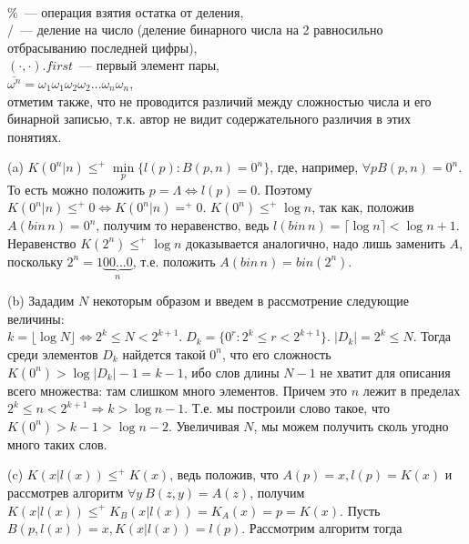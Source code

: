 
\\
\%~--- операция взятия остатка от деления, \\
/~--- деление на число (деление бинарного числа на 2 равносильно отбрасыванию последней цифры), \\
$(\cdot,\cdot).first$~--- первый элемент пары,\\
$\overline{\omega^n} = \omega_1\omega_1\omega_2\omega_2\ldots \omega_n\omega_n$, \\
отметим также, что не проводится различий между сложностью числа и его бинарной записью, т.к. автор не видит содержательного различия в этих понятиях. 

(a) $K(0^n|n)\le^+\min\limits_p\{l(p) \colon B(p,n)=0^n\}$, где, например, $ \forall p B(p,n)=0^n$. То есть можно положить $p=\Lambda \Leftrightarrow l(p)=0$. Поэтому   $K(0^n|n)\le^+0 \Leftrightarrow K(0^n|n)=^+0$.
$K(0^n)\le^+\log n$, так как, положив $A(bin\,n)=0^n$, получим то неравенство, ведь $l(bin \, n) = \lceil\log n\rceil <\log n +1$. 
Неравенство $K(2^n)\le^+\log n$ доказывается аналогично, надо лишь заменить $A$, поскольку $2^n=1\underbrace{00\ldots0}_n$, т.е. положить $A(bin\,n)=bin(2^n)$.

(b) Зададим $N$ некоторым образом и введем в рассмотрение следующие величины: $k=\lfloor\log N\rfloor \Leftrightarrow 2^k\le N < 2^{k+1}.\;
		D_k=\{0^r\colon 2^k\le r < 2^{k+1}\}.\; |D_k|=2^k\le N.$ Тогда среди элементов $D_k$ найдется такой $0^n$, что его сложность $K(0^n)> \log |D_k|-1=k-1$, ибо слов длины $N-1$ не хватит для описания всего множества: там слишком много элементов. Причем это $n$ лежит в пределах $2^k\le n < 2^{k+1} \Rightarrow k  > \log n -1$. Т.е. мы построили слово такое, что $K(0^n)>k-1>\log n -2$. Увеличивая $N$, мы можем получить сколь угодно много таких слов. 
		
(c) $K(x|l(x))\le^+K(x)$, ведь положив, что $A(p)=x, l(p)=K(x)$ и рассмотрев алгоритм $\forall y \: B(z,y)=A(z)$, получим $K(x|l(x))\le^+K_B(x|l(x))=K_A(x)=p=K(x)$.
Пусть $B(p,l(x))=x, K(x|l(x))=l(p).$ Рассмотрим алгоритм 
тогда 


